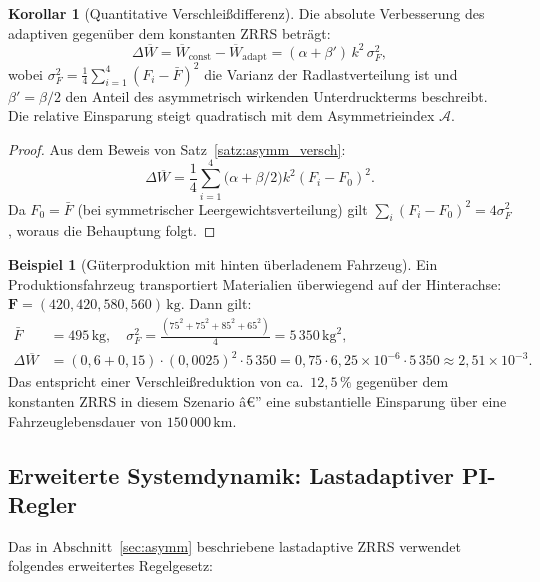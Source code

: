 ﻿\documentclass[a4paper,12pt]{article}
\theoremstyle{definition}
\newtheorem{beispiel}{Beispiel}
\newtheorem{korollar}{Korollar}
\begin{document}
\begin{korollar}[Quantitative Verschleißdifferenz]
\label{kor:quantdiff}
Die absolute Verbesserung des adaptiven gegenüber dem konstanten ZRRS beträgt:
\[
    \Delta\overline{W} = \overline{W}_{\text{const}} - \overline{W}_{\text{adapt}}
    = (\alpha + \beta')\, k^2\, \sigma^2_F,
\]
wobei $\sigma^2_F = \frac{1}{4}\sum_{i=1}^{4}(F_i - \bar{F})^2$ die Varianz
der Radlastverteilung ist und $\beta' = \beta/2$ den Anteil des asymmetrisch
wirkenden Unterdruckterms beschreibt. Die relative Einsparung steigt quadratisch
mit dem Asymmetrieindex $\mathcal{A}$.
\end{korollar}

\begin{proof}
Aus dem Beweis von Satz~\ref{satz:asymm_versch}:
\[
    \Delta\overline{W} = \frac{1}{4}\sum_{i=1}^4
    \bigl(\alpha + \beta/2\bigr) k^2 (F_i - F_0)^2.
\]
Da $F_0 = \bar{F}$ (bei symmetrischer Leergewichtsverteilung) gilt
$\sum_i(F_i - F_0)^2 = 4\sigma^2_F$, woraus die Behauptung folgt.
\end{proof}

\begin{beispiel}[Güterproduktion mit hinten überladenem Fahrzeug]
Ein Produktionsfahrzeug transportiert Materialien überwiegend auf der
Hinterachse: $\mathbf{F} = (420, 420, 580, 560)\,\text{kg}$. Dann gilt:
\begin{align*}
    \bar{F} &= 495\,\text{kg},\quad
    \sigma^2_F = \frac{(75^2 + 75^2 + 85^2 + 65^2)}{4} = 5\,350\,\text{kg}^2,\\
    \Delta\overline{W} &= (0{,}6 + 0{,}15)\cdot (0{,}0025)^2 \cdot 5\,350
    = 0{,}75 \cdot 6{,}25 \times 10^{-6} \cdot 5\,350
    \approx 2{,}51 \times 10^{-3}.
\end{align*}
Das entspricht einer Verschleißreduktion von ca.\ $12{,}5\,\%$ gegenüber
dem konstanten ZRRS in diesem Szenario â€” eine substantielle Einsparung
über eine Fahrzeuglebensdauer von $150\,000\,\text{km}$.
\end{beispiel}

\subsection{Erweiterte Systemdynamik: Lastadaptiver PI-Regler}

Das in Abschnitt~\ref{sec:asymm} beschriebene lastadaptive ZRRS verwendet
folgendes erweitertes Regelgesetz:
\end{document}
